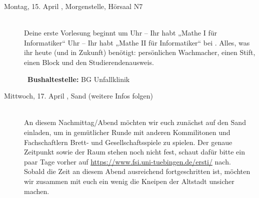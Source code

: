 \begin{description}
\ifbachelor
\item[Montag, 15. April \YEAR, Morgenstelle, Hörsaal N7]\ \\
Deine erste Vorlesung beginnt um
 Uhr -- Ihr habt „Mathe I für Informatiker“  \fi
{} Uhr -- Ihr habt „Mathe II für Informatiker“  \fi
bei \Matheprof.
Alles, was ihr heute (und in Zukunft) benötigt: persönlichen Wachmacher, einen Stift, einen Block und den Studierendenausweis.

~\textbf{Bushaltestelle:} BG Unfallklinik
\fi



%
%


\item[Mittwoch, 17. April \YEAR,  Sand (weitere Infos folgen)]\ \\
An diesem Nachmittag/Abend möchten wir euch zunächst auf den Sand einladen, um in gemütlicher Runde mit anderen Kommilitonen und Fachschaftlern Brett- und Gesellschaftsspiele zu spielen. Der genaue Zeitpunkt sowie der Raum stehen noch nicht fest, schaut dafür bitte ein paar Tage vorher auf \url{https://www.fsi.uni-tuebingen.de/ersti/} nach.\\ Sobald die Zeit an diesem Abend ausreichend fortgeschritten ist, möchten wir zusammen mit euch ein wenig die Kneipen der Altstadt unsicher machen. 


\end{description}
